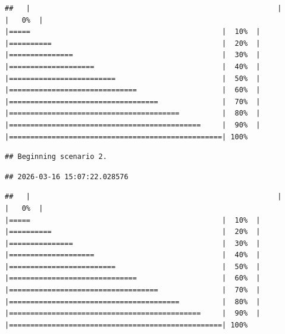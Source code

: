\documentclass[
]{article}
\begin{document}
\begin{verbatim}
##   |                                                          |                                                  |   0%  |                                                          |=====                                             |  10%  |                                                          |==========                                        |  20%  |                                                          |===============                                   |  30%  |                                                          |====================                              |  40%  |                                                          |=========================                         |  50%  |                                                          |==============================                    |  60%  |                                                          |===================================               |  70%  |                                                          |========================================          |  80%  |                                                          |=============================================     |  90%  |                                                          |==================================================| 100%
\end{verbatim}

\begin{verbatim}
## Beginning scenario 2.
\end{verbatim}

\begin{verbatim}
## 2026-03-16 15:07:22.028576
\end{verbatim}

\begin{verbatim}
##   |                                                          |                                                  |   0%  |                                                          |=====                                             |  10%  |                                                          |==========                                        |  20%  |                                                          |===============                                   |  30%  |                                                          |====================                              |  40%  |                                                          |=========================                         |  50%  |                                                          |==============================                    |  60%  |                                                          |===================================               |  70%  |                                                          |========================================          |  80%  |                                                          |=============================================     |  90%  |                                                          |==================================================| 100%
\end{verbatim}
\end{document}
